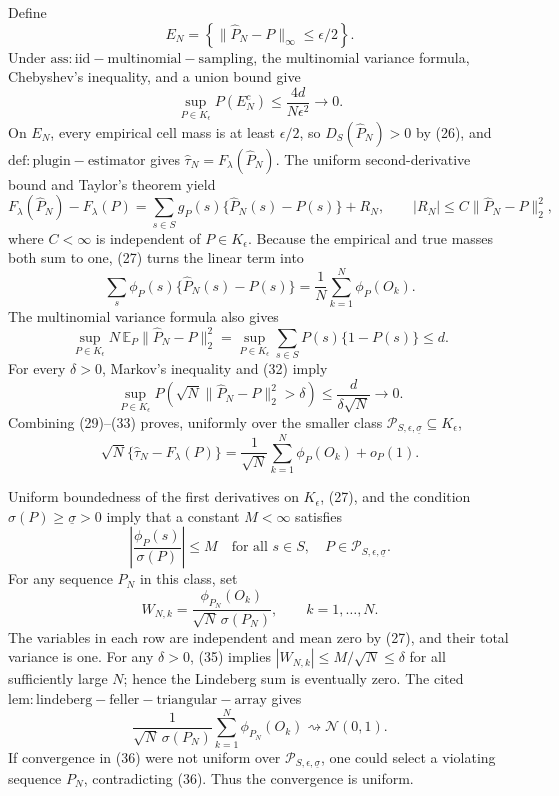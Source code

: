 Define
\[
E_N=\left\{\|\widehat P_N-P\|_\infty\le\epsilon/2\right\}.
\]
Under \(\mathrm{ass:iid-multinomial-sampling}\), the multinomial variance formula, Chebyshev's inequality, and a union bound give
\[
\sup_{P\in K_\epsilon}P(E_N^c)
\le \frac{4d}{N\epsilon^2}\longrightarrow0.                 \tag{29}
\]
On \(E_N\), every empirical cell mass is at least \(\epsilon/2\), so \(D_S(\widehat P_N)>0\) by (26), and \(\mathrm{def:plugin-estimator}\) gives \(\widehat\tau_N=F_\lambda(\widehat P_N)\).  The uniform second-derivative bound and Taylor's theorem yield
\[
F_\lambda(\widehat P_N)-F_\lambda(P)
=\sum_{s\in S}g_P(s)\{\widehat P_N(s)-P(s)\}+R_N,
\qquad
|R_N|\le C\|\widehat P_N-P\|_2^2,                            \tag{30}
\]
where \(C<\infty\) is independent of \(P\in K_\epsilon\).  Because the empirical and true masses both sum to one, (27) turns the linear term into
\[
\sum_s\phi_P(s)\{\widehat P_N(s)-P(s)\}
=\frac1N\sum_{k=1}^N\phi_P(O_k).                             \tag{31}
\]
The multinomial variance formula also gives
\[
\sup_{P\in K_\epsilon}N\,\mathbb E_P
   \|\widehat P_N-P\|_2^2
=\sup_{P\in K_\epsilon}\sum_{s\in S}P(s)\{1-P(s)\}
\le d.                                                        \tag{32}
\]
For every \(\delta>0\), Markov's inequality and (32) imply
\[
\sup_{P\in K_\epsilon}
P\!\left(\sqrt N\|\widehat P_N-P\|_2^2>\delta\right)
\le\frac{d}{\delta\sqrt N}\longrightarrow0.                \tag{33}
\]
Combining (29)--(33) proves, uniformly over the smaller class \(\mathcal P_{S,\epsilon,\underline\sigma}\subseteq K_\epsilon\),
\[
\sqrt N\{\widehat\tau_N-F_\lambda(P)\}
=\frac1{\sqrt N}\sum_{k=1}^N\phi_P(O_k)+o_P(1).             \tag{34}
\]

Uniform boundedness of the first derivatives on \(K_\epsilon\), (27), and the condition \(\sigma(P)\ge\underline\sigma>0\) imply that a constant \(M<\infty\) satisfies
\[
\left|\frac{\phi_P(s)}{\sigma(P)}\right|\le M
\quad\text{for all }s\in S,
\quad P\in\mathcal P_{S,\epsilon,\underline\sigma}.       \tag{35}
\]
For any sequence \(P_N\) in this class, set
\[
W_{N,k}=\frac{\phi_{P_N}(O_k)}{\sqrt N\,\sigma(P_N)},
\qquad k=1,\ldots,N.
\]
The variables in each row are independent and mean zero by (27), and their total variance is one.  For any \(\delta>0\), (35) implies \(|W_{N,k}|\le M/\sqrt N\le\delta\) for all sufficiently large \(N\); hence the Lindeberg sum is eventually zero.  The cited \(\mathrm{lem:lindeberg-feller-triangular-array}\) gives
\[
\frac1{\sqrt N\,\sigma(P_N)}
\sum_{k=1}^N\phi_{P_N}(O_k)
\rightsquigarrow\mathcal N(0,1).                             \tag{36}
\]
If convergence in (36) were not uniform over \(\mathcal P_{S,\epsilon,\underline\sigma}\), one could select a violating sequence \(P_N\), contradicting (36).  Thus the convergence is uniform.

